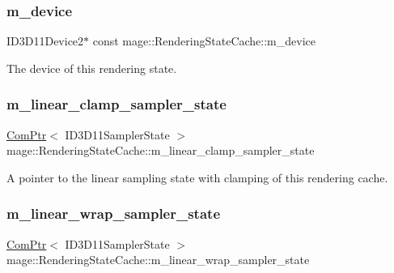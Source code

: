 \subsubsection{\texorpdfstring{m\+\_\+device}{m\_device}}
{\footnotesize\ttfamily I\+D3\+D11\+Device2$\ast$ const mage\+::\+Rendering\+State\+Cache\+::m\+\_\+device\hspace{0.3cm}{\ttfamily [private]}}

The device of this rendering state. \hypertarget{structmage_1_1_rendering_state_cache_a8086db2af33ea844744f3e81a4471af6}{}\label{structmage_1_1_rendering_state_cache_a8086db2af33ea844744f3e81a4471af6} 
\subsubsection{\texorpdfstring{m\+\_\+linear\+\_\+clamp\+\_\+sampler\+\_\+state}{m\_linear\_clamp\_sampler\_state}}
{\footnotesize\ttfamily \hyperlink{namespacemage_ae74f374780900893caa5555d1031fd79}{Com\+Ptr}$<$ I\+D3\+D11\+Sampler\+State $>$ mage\+::\+Rendering\+State\+Cache\+::m\+\_\+linear\+\_\+clamp\+\_\+sampler\+\_\+state\hspace{0.3cm}{\ttfamily [private]}}

A pointer to the linear sampling state with clamping of this rendering cache. \hypertarget{structmage_1_1_rendering_state_cache_a7f7289f3759840045dbe3dd2785199a8}{}\label{structmage_1_1_rendering_state_cache_a7f7289f3759840045dbe3dd2785199a8} 
\subsubsection{\texorpdfstring{m\+\_\+linear\+\_\+wrap\+\_\+sampler\+\_\+state}{m\_linear\_wrap\_sampler\_state}}
{\footnotesize\ttfamily \hyperlink{namespacemage_ae74f374780900893caa5555d1031fd79}{Com\+Ptr}$<$ I\+D3\+D11\+Sampler\+State $>$ mage\+::\+Rendering\+State\+Cache\+::m\+\_\+linear\+\_\+wrap\+\_\+sampler\+\_\+state\hspace{0.3cm}{\ttfamily [private]}}

